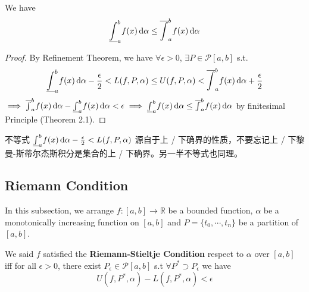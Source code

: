 \documentclass[
	UTF-8,
	11pt, %
	a4paper, %
]{LegrandOrangeBook}
\begin{document}
    \begin{theorem}
        We have 
        $$
            \underline{\int}_{a}^{b}f(x) \, \mathrm{d} \alpha \leq \overline{\int}_{a}^{b}f(x) \, \mathrm{d} \alpha
        $$

    \end{theorem}

    \begin{proof}
        By Refinement Theorem, we have $\forall \epsilon >0 $, $\exists P \in \mathcal{P}[a,b]$ s.t.
        $$
        \underline{\int}_{a}^{b}f(x) \, \mathrm{d} \alpha - {\epsilon \over 2} < L(f , P, \alpha) \leq U(f , P, \alpha) <\overline{\int}_{a}^{b}f(x) \, \mathrm{d} \alpha  + {\epsilon \over 2}
        $$
        $\implies \overline{\int}_{a}^{b}f(x) \, \mathrm{d} \alpha - \underline{\int}_{a}^{b}f(x) \, \mathrm{d} \alpha < \epsilon \implies \underline{\int}_{a}^{b}f(x) \, \mathrm{d} \alpha \leq \overline{\int}_{a}^{b}f(x) \, \mathrm{d} \alpha$ 
        by finitesimal Principle (Theorem 2.1).
    \end{proof}

    \begin{remark}
        不等式
        $
        \underline{\int}_{a}^{b}f(x) \, \mathrm{d} \alpha - {\epsilon \over 2} < L(f , P, \alpha)
        $
        源自于上 / 下确界的性质，不要忘记上 / 下黎曼-斯蒂尔杰斯积分是集合的上 / 下确界。另一半不等式也同理。
    \end{remark}

    \newpage

    \subsection{Riemann Condition}

        In this subsection, we arrange $f: [a, b] \to \mathbb{R} $ be a bounded function,
        $\alpha$ be a monotonically increasing function on $[a, b]$ and $P=\{t_0,\cdots, t_n\}$ 
        be a partition of $[a,b]$.

    \begin{definition}
    
        We said $f$ satisfied the \textbf{Riemann-Stieltje Condition} respect to $\alpha$ over $[a,b]$ iff 
        for all  $\epsilon > 0$, 
        there exist $P_{\epsilon} \in \mathcal{P}[a,b]$ s.t $\forall P^{*} \supset P_{\epsilon}$ we have
        $$
            U(f,P^{*},\alpha) - L(f,P^{*},\alpha) < \epsilon
        $$

    \end{definition}
\end{document}
